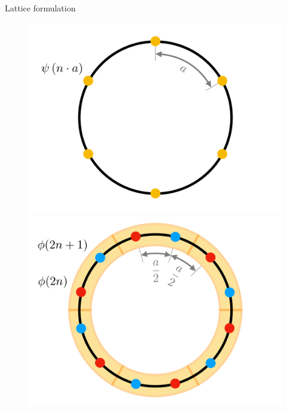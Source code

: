 \documentclass[9pt, handout, aspectratio=169]{beamer}	%
\begin{document}
\begin{frame}[allowframebreaks]{Lattice formulation}
	\begin{figure}[!tbp]
		\centering
		\begin{minipage}[c]{.45\linewidth}
			\centering
			\includegraphics[width=\linewidth]{Figures/NJL1-model-solving/theoretical-fermion-lattice}
		\end{minipage}
	  \hspace{.025\linewidth}
		\begin{minipage}[c]{.45\linewidth}
			\centering
			\includegraphics[width=\linewidth]{Figures/NJL1-model-solving/computational-fermion-lattice}
		\end{minipage}
	\end{figure}


\end{frame}
\end{document}
